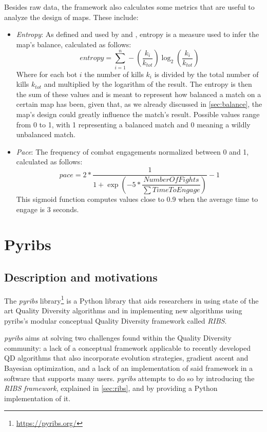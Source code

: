 Besides raw data, the framework also calculates some metrics that are useful to analyze the design of maps. These include:

\begin{itemize}
    \item \textit{Entropy}: As defined and used by \citet{lanzi_evolving_2014} and \citet{loiacono_fight_2017}, entropy is a measure used to infer the map's balance, calculated as follows:
    \begin{equation}
        entropy = \sum_{i=1}^{n} - \left(\dfrac{k_i}{k_{tot}}\right) \log_2 \left(\dfrac{k_i}{k_{tot}}\right)
    \end{equation}
    Where for each bot $i$ the number of kills $k_i$ is divided by the total number of kills $k_{tot}$ and multiplied by the logarithm of the result. The entropy is then the sum of these values and is meant to represent how balanced a match on a certain map has been, given that, as we already discussed in \cref{sec:balance}, the map's design could greatly influence the match's result. Possible values range from 0 to 1, with 1 representing a balanced match and 0 meaning a wildly unbalanced match.
    \item \textit{Pace}: The frequency of combat engagements normalized between 0 and 1, calculated as follows:
    \begin{equation}
        pace = 2 * \dfrac{1}{1 + \exp \left(-5 * \dfrac{NumberOfFights}{\sum TimeToEngage}\right)} - 1
    \end{equation}
    This sigmoid function computes values close to 0.9 when the average time to engage is 3 seconds.

\end{itemize}

\section{Pyribs}
\label{ch:pyribs}
\subsection{Description and motivations}
\label{sec:pyribs_description}
The \textit{pyribs} library\footnote{\url{https://pyribs.org/}} is a Python library that aids researchers in using state of the art Quality Diversity algorithms and in implementing new algorithms using pyribs's modular conceptual Quality Diversity framework called \textit{RIBS}.

\textit{pyribs} aims at solving two challenges found within the Quality Diversity community: a lack of a conceptual framework applicable to  recently developed QD algorithms that also incorporate evolution strategies, gradient ascent and Bayesian optimization, and a lack of an implementation of said framework in a software that supports many users. \textit{pyribs} attempts to do so by introducing the \textit{RIBS framework}, explained in \cref{sec:ribs}, and by providing a Python implementation of it. \cite{tjanaka_pyribs_2023}

